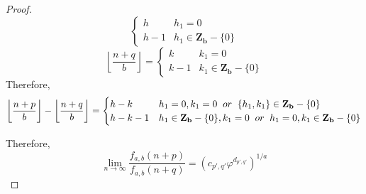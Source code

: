 \documentclass[preprint,12pt]{elsarticle}
\begin{document}
\begin{proof}
\begin{equation*}
\begin{cases}
		h & h_1 = 0\\
		h - 1 & h_1 \in \mathbf{Z_b} - \{0\}
		\end{cases}
	\end{equation*}
	\begin{equation*}
		\left\lfloor\dfrac{n + q}{b}\right\rfloor = \begin{cases}
		k & k_1 = 0\\
		k - 1 & k_1 \in \mathbf{Z_b} - \{0\}
		\end{cases}
	\end{equation*}
	Therefore,\\
	\begin{equation*}
		\left\lfloor\dfrac{n + p}{b}\right\rfloor -\left\lfloor\dfrac{n + q}{b}\right\rfloor  = \begin{cases}
		h - k & h_1 = 0, k_1 = 0 \hspace{2mm}or\hspace{2mm}\{h_1, k_1\} \in \mathbf{Z_b} - \{0\}\\
		h - k - 1 & h_1 \in \mathbf{Z_b} - \{0\}, k_1 = 0\hspace{2mm}or\hspace{2mm} h_1= 0, k_1 \in \mathbf{Z_b} - \{0\}
		\end{cases}
	\end{equation*}
		
	Therefore,\\
	$$\lim_{n \to \infty} \dfrac{f_{a,b}(n + p)}{f_{a,b}(n + q)} = \left(c_{p',q'}\varphi^{d_{p',q'}}\right)^{1/a}$$
\end{proof}
\end{document}
